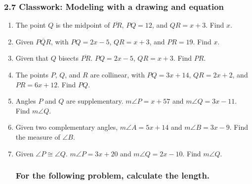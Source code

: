 \documentclass[12pt, twoside]{article}
\begin{document}
  \subsubsection*{2.7 Classwork: Modeling with a drawing and equation}
  \begin{enumerate}
    \subsubsection*{Do Not Solve! Make a drawing on the right, an equation to the left, and circle where it states what to find.}
    \vspace{0.5cm}

\item The point $Q$ is the midpoint of $\overline{PR}$, $PQ=12$, and $QR=x+3$. Find ${x}$.
\vspace{4cm}

\item Given $\overline{PQR}$, with $PQ=2x-5$, $QR=x+3$, and $PR=19$. Find ${x}$.
\vspace{4cm}

\item Given that $Q$ bisects $\overline{PR}$. $PQ=2x-5$, $QR=x+3$. Find ${PR}$.
\vspace{4cm}

\item The points $P$, $Q$, and $R$ are collinear, with $PQ=3x+14$, $QR=2x+2$, and $PR=6x+12$. Find ${PQ}$.
\vspace{4cm}

\newpage

\item Angles $P$ and $Q$ are supplementary. $m\angle P = x+57$ and $m\angle Q = 3x-11$. Find $m\angle Q$. \vspace{3.5cm} 

\item Given two complementary angles, $m\angle A = 5x+14$ and $m\angle B = 3x-9$. Find the measure of $\angle B$. \vspace{3.5cm} 

\item Given $\angle P \cong \angle Q$. $m\angle P = 3x+20$ and $m\angle Q = 2x-10$. Find $m\angle Q$. \vspace{3.5cm} 

\subsubsection*{For the following problem, calculate the length.}


\end{enumerate}
\end{document}
